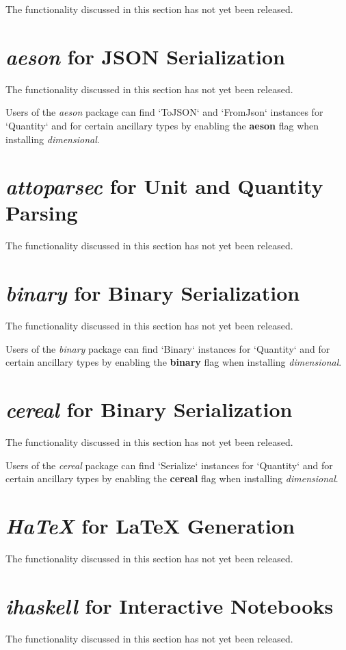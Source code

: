\documentclass[11pt]{report}
\newcommand{\packagename}[1]{\textit{#1}}
\newcommand{\thispackage}{\packagename{dimensional}}
\newcommand{\flag}[1]{\textbf{#1}}
\newcommand{\prerelease}{\begin{framed}
The functionality discussed in this section has not yet been released.
\end{framed}}
\begin{document}
\prerelease{}

\section{\packagename{aeson} for JSON Serialization}

\prerelease{}

Users of the \packagename{aeson} package can find `ToJSON`
and `FromJson` instances for `Quantity` and for certain ancillary types by
enabling the \flag{aeson} flag when installing \thispackage{}.

\section{\packagename{attoparsec} for Unit and Quantity Parsing}

\prerelease{}

\section{\packagename{binary} for Binary Serialization}

\prerelease{}

Users of the \packagename{binary} package can find `Binary`
instances for `Quantity` and for certain ancillary types by
enabling the \flag{binary} flag when installing \thispackage{}.

\section{\packagename{cereal} for Binary Serialization}

\prerelease{}

Users of the \packagename{cereal} package can find `Serialize`
instances for `Quantity` and for certain ancillary types by
enabling the \flag{cereal} flag when installing \thispackage{}.

\section{\packagename{HaTeX} for \LaTeX{} Generation}

\prerelease{}

\section{\packagename{ihaskell} for Interactive Notebooks}

\prerelease{}
\end{document}
